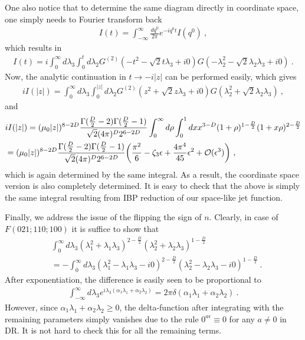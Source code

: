 \documentclass[a4paper,11pt]{article}
\begin{document}
  
One also notice that to determine the same diagram directly in coordinate space, one simply needs to Fourier transform back 
\begin{align}
I(t)=\int_{-\infty}^{\infty}  \frac{dq^0}{2\pi} e^{-iq^0t} I(q^0) \ ,
\end{align}
which results in 
\begin{align}
I(t)=i\int_{0}^{\infty} d\lambda_3 \int_{0}^{t} d\lambda_2 G^{(2)}(-t^2-\sqrt{2}t\lambda_3 +i0)G(-\lambda_2^2-\sqrt{2}\lambda_2\lambda_3 +i0) \ .
\end{align}
Now, the analytic continuation in $t\rightarrow -i|z|$ can be performed easily, which gives 
\begin{align}
iI(|z|)=\int_{0}^{\infty} d\lambda_3 \int_{0}^{|z|} d\lambda_2 G^{(2)}(z^2+\sqrt{2}z\lambda_3 +i0)G(\lambda_2^2+\sqrt{2}\lambda_2\lambda_3) \ ,
\end{align}
and
\begin{align}
&iI(|z|)=(\mu_0 |z|)^{8-2D}\frac{\Gamma(\frac{D}{2}-2)\Gamma(\frac{D}{2}-1)}{\sqrt{2}(4\pi)^D2^{6-2D}}\int_{0}^{\infty} d\rho\int_{0}^1 dx x^{3-D}(1+\rho)^{1-\frac{D}{2}}(1+x\rho)^{2-\frac{D}{2}} \nonumber \\
&=(\mu_0 |z|)^{8-2D}\frac{\Gamma(\frac{D}{2}-2)\Gamma(\frac{D}{2}-1)}{\sqrt{2}(4\pi)^D2^{6-2D}}\bigg(\frac{\pi^2}{6}-\zeta_3\epsilon+\frac{4\pi^4}{45}\epsilon^2+{\cal O}(\epsilon^3)\bigg) \ ,
\end{align}
which is again determined by the same integral. As a result, the coordinate space version is also completely determined. It is easy to check that the above is simply the same integral resulting from IBP reduction of our space-like jet function. 

Finally, we address the issue of the flipping the sign of $n$. Clearly, in case of $F(021;110;100)$ it is suffice to show that 
\begin{align}
 &\int_{0}^{\infty} d\lambda_3 (\lambda_1^2+\lambda_1\lambda_3)^{2-\frac{D}{2}}(\lambda_2^2 +\lambda_2\lambda_3)^{1-\frac{D}{2}}\nonumber \\ 
 &=-\int_{0}^{\infty} d\lambda_3 (\lambda_1^2-\lambda_1\lambda_3-i0)^{2-\frac{D}{2}}(\lambda_2^2 -\lambda_2\lambda_3-i0)^{1-\frac{D}{2}}\ .
\end{align}
After exponentiation, the difference is easily seen to be proportional to
\begin{align}
\int_{-\infty}^{\infty} d\lambda_3 e^{i\lambda_3\left(\alpha_1\lambda_1+\alpha_2\lambda_2\right)}=2\pi \delta(\alpha_1\lambda_1+\alpha_2\lambda_2) \ .
\end{align}
However, since $\alpha_1\lambda_1+\alpha_2\lambda_2 \ge 0$, the delta-function after integrating with the remaining parameters simply vanishes due to the rule $0^{a\epsilon}\equiv 0$ for any $a \ne 0$ in DR. It is not hard to check this for all the remaining terms. 







\end{document}
